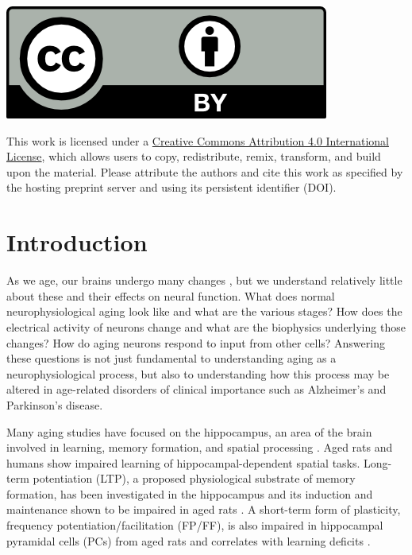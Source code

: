 \documentclass[12pt]{article}
\begin{document}
\vspace{2cm}

\begin{minipage}{0.2\textwidth}
\includegraphics[width=0.8\textwidth]{figures/ccby.png}
\end{minipage}%
\begin{minipage}{0.75\textwidth}
\begin{scriptsize}
This work is licensed under a \href{https://creativecommons.org/licenses/by/4.0/}{Creative Commons Attribution 4.0 International License}, which allows users to copy, redistribute, remix, transform, and build upon the material. Please attribute the authors and cite this work as specified by the hosting preprint server and using its persistent identifier (DOI).
\end{scriptsize}
\end{minipage}

\newpage

\linenumbers

\section{Introduction}
As we age, our brains undergo many changes
\citep{oh2010learning,rosenzweig2003impact}, but we understand relatively little about these and their effects on neural function. What does
normal neurophysiological aging look like and what are the various stages? How does the electrical activity of neurons change and what are the biophysics underlying those changes?  How do
aging neurons respond to input from other cells? Answering these questions is not
just fundamental to understanding aging as a neurophysiological process, but also to understanding how this process may be altered in age-related disorders of clinical importance such as Alzheimer's \cite{fjell2014normal} and Parkinson's \cite{rodriguez2015parkinson} disease.

Many aging studies have focused on the hippocampus, an area of the brain involved in learning, memory formation, and spatial processing
\citep{oh2010learning,rosenzweig2003impact}. Aged rats \citep{barnes1985age,gage1984spatial,caprioli1991spatial} and humans \citep{wilkniss1997age} show impaired learning of hippocampal-dependent spatial tasks. Long-term potentiation (LTP), a proposed physiological substrate of memory formation, has been investigated in the hippocampus and its induction and maintenance
shown to be impaired in aged rats
\citep{deupree1993age,rosenzweig1997role}. A short-term form of plasticity, frequency potentiation/facilitation
(FP/FF), is also impaired in hippocampal pyramidal cells (PCs) from aged rats and correlates
with learning deficits
\citep{landfield1978impaired}.
\end{document}
